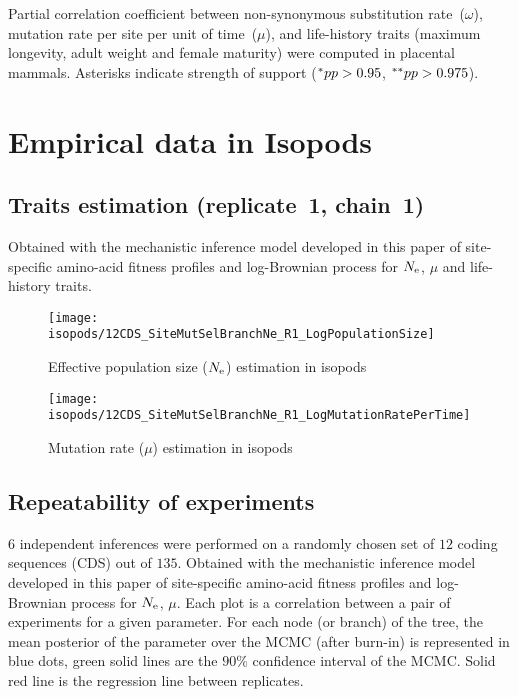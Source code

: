 \begin{table}[H]
    
    \caption[Partial correlation coefficient matrix in mammals ($\omega$)]{
    Partial correlation coefficient between non-synonymous substitution rate~($\omega$), mutation rate per site per unit of time~($\mu$), and life-history traits (maximum longevity, adult weight and female maturity) were computed in placental mammals.
    Asterisks indicate strength of support ($\smash{^{*}} pp > 0.95$, $\smash{^{**}} pp > 0.975$).}
\end{table}


\section{Empirical data in Isopods}
\label{sec:empirical-data-in-isopods}

\subsection{Traits estimation (replicate~1, chain~1)}
Obtained with the mechanistic inference model developed in this paper of site-specific amino-acid fitness profiles and log-Brownian process for $\Ne$, $\mu$ and life-history traits.

\begin{figure}[H]
    \centering
    \texttt{[image: isopods/12CDS\_SiteMutSelBranchNe\_R1\_LogPopulationSize]}
    \caption[$\Ne$ estimation in isopods]{Effective population size ($\Ne$) estimation in isopods}
\end{figure}

\begin{figure}[H]
    \centering
    \texttt{[image: isopods/12CDS\_SiteMutSelBranchNe\_R1\_LogMutationRatePerTime]}
    \caption[Mutation rate estimation in isopods]{Mutation rate ($\mu$) estimation in isopods}
\end{figure}

\subsection{Repeatability of experiments}
\label{subsec:repeatability-of-experiments-isopods}
$6$ independent inferences were performed on a randomly chosen set of $12$ coding sequences (\acrshort{CDS}) out of $135$.
Obtained with the mechanistic inference model developed in this paper of site-specific amino-acid fitness profiles and log-Brownian process for $\Ne$, $\mu$.
Each plot is a correlation between a pair of experiments for a given parameter.
For each node (or branch) of the tree, the mean posterior of the parameter over the \acrshort{MCMC} (after burn-in) is represented in blue dots, green solid lines are the $90\%$ confidence interval of the \acrshort{MCMC}.
Solid red line is the regression line between replicates.

